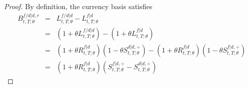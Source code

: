 \documentclass[11pt,english]{amsart}
\newcommand{\EE}{\mathbb{E}}
\theoremstyle{definition}
\begin{document}
\begin{proof}
By definition, the currency basis satisfies
\begin{eqnarray*}
  B^{f/d|d,r}_{t,T;\theta} 
  &=& L^{f/d|d}_{t,T;\theta}  - L^{f|d}_{t,T;\theta}  \\
  &=& (1+\theta L^{f/d|d}_{t,T;\theta}) - (1+\theta L^{f|d}_{t,T;\theta})  \\
  &=& \left( 1+\theta R^{f|d}_{t,T;\theta} \right) \left( 1 - \theta S^{d|d,\div}_{t,T;\theta} \right) - \left( 1+\theta R^{f|d}_{t,T;\theta} \right) \left( 1 - \theta S^{f|d,\div}_{t,T;\theta} \right) \\
  &=& \left(1+\theta R^{f|d}_{t,T;\theta} \right)  \left(S^{f|d,\div}_{t,T;\theta} - S^{d|d,\div}_{t,T;\theta} \right)  
\end{eqnarray*} 
\end{proof}

\end{document}
